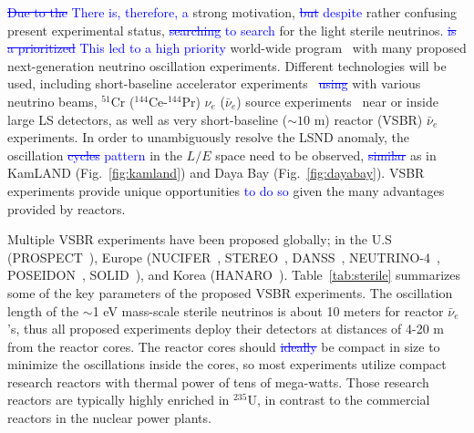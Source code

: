 \documentclass[aps,twocolumn,preprintnumbers,amsmath,superscriptaddress,amssymb,floats,nofootinbib]{revtex4-1}
\begin{document}
\textcolor{blue}{\st{Due to the} There is, therefore, a} strong motivation, 
\textcolor{blue}{\st{but} despite} rather confusing present experimental status, 
\textcolor{blue}{\st{searching} to search} for the light sterile neutrinos.
\textcolor{blue}{\st{ is a prioritized} This led to a high priority} world-wide program~\cite{sterileWP} with many proposed next-generation neutrino oscillation experiments.
Different technologies will be used, including short-baseline accelerator experiments~\cite{IsoDAR,OscSNS,NESSiE,LAr1-ND,nuSTORM} 
\textcolor{blue}{\st{using}} with various neutrino beams, 
$^{51}$Cr ($^{144}$Ce-$^{144}$Pr) $\nu_e$ ($\bar\nu_e$) source experiments~\cite{Cribier2011,Dwyer2013,SOX,CeLAND} near or inside large LS detectors, as well as very short-baseline ($\sim10$ m) reactor (VSBR) $\bar\nu_e$ experiments. 
In order to unambiguously resolve the LSND anomaly, the oscillation \textcolor{blue}{\st{cycles} pattern} in the $L/E$ space need to be observed, 
\textcolor{blue}{\st{similar}} as in KamLAND (Fig.~\ref{fig:kamland}) and Daya Bay (Fig.~\ref{fig:dayabay}). 
VSBR experiments provide unique opportunities \textcolor{blue}{to do so} given the many advantages provided by reactors.

Multiple VSBR experiments have been proposed globally; in the U.S (PROSPECT~\cite{PROSPECT}), Europe (NUCIFER~\cite{NUCIFER-2010, NUCIFER-2014}, STEREO~\cite{NUCIFER-2014}, DANSS~\cite{DANSS}, NEUTRINO-4~\cite{NEUTRINO4-2012,NEUTRINO4-2014}, POSEIDON~\cite{POSEIDON}, SOLID~\cite{SoLid}), and Korea (HANARO~\cite{HANARO}). 
Table~\ref{tab:sterile} summarizes some of the key parameters of the proposed VSBR experiments. 
The oscillation length of the $\sim$1 eV mass-scale sterile neutrinos is about 10 meters for reactor $\bar\nu_e$'s, thus all proposed experiments deploy their detectors at distances of 4-20 m from the reactor cores. 
The reactor cores should \textcolor{blue}{\st{ideally}} be compact in size to minimize the oscillations inside the cores, 
so most experiments utilize compact research reactors with thermal power of tens of mega-watts. Those research reactors are typically highly enriched in $^{235}$U, in contrast to the commercial reactors in the nuclear power plants. 
\end{document}
